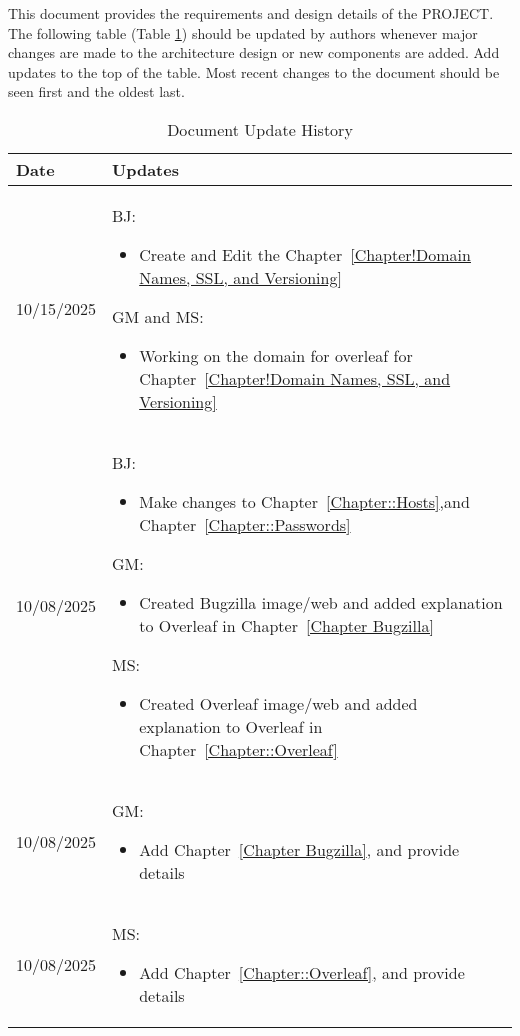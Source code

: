 This document provides the requirements and design details of the
PROJECT.  The following table (Table \ref{Table::UpdateHistory}) should be
updated by authors whenever major changes are made to the architecture
design or new components are added. Add updates to the top of the table.  
Most recent changes to the document should be seen first and the oldest 
last.

\begin{longtable}{|l||p{13.5cm}|}
\caption{Document Update History \label{Table::UpdateHistory}}\\
\hline
\textbf{Date} & \textbf{Updates} \\
\hline 
\endhead




10/15/2025 & BJ:
\begin{itemize}[topsep=0pt,itemsep=0pt,parsep=0pt,partopsep=0pt,leftmargin=12pt]
\item Create and Edit the Chapter~\ref{Chapter!Domain Names, SSL, and Versioning} 
\end{itemize} 
GM and MS:
\begin{itemize}[topsep=0pt,itemsep=0pt,parsep=0pt,partopsep=0pt,leftmargin=12pt]
\item Working on the domain for overleaf for  Chapter~\ref{Chapter!Domain Names, SSL, and Versioning}
\end{itemize} 
\\ \hline



10/08/2025 & BJ:
\begin{itemize}[topsep=0pt,itemsep=0pt,parsep=0pt,partopsep=0pt,leftmargin=12pt]
\item Make changes to Chapter~\ref{Chapter::Hosts},and Chapter~\ref{Chapter::Passwords} 
\end{itemize} 
GM:
\begin{itemize}[topsep=0pt,itemsep=0pt,parsep=0pt,partopsep=0pt,leftmargin=12pt]
\item Created Bugzilla image/web and added explanation to Overleaf in Chapter~\ref{Chapter Bugzilla}
\end{itemize} 
MS:
\begin{itemize}[topsep=0pt,itemsep=0pt,parsep=0pt,partopsep=0pt,leftmargin=12pt]
\item Created Overleaf image/web and added explanation to Overleaf in Chapter~\ref{Chapter::Overleaf}
\end{itemize} 
\\ \hline
10/08/2025 & GM:
\begin{itemize}[topsep=0pt,itemsep=0pt,parsep=0pt,partopsep=0pt,leftmargin=12pt]
\item Add Chapter~\ref{Chapter Bugzilla}, and provide details
\end{itemize} 
\\ \hline
10/08/2025 & MS:
\begin{itemize}[topsep=0pt,itemsep=0pt,parsep=0pt,partopsep=0pt,leftmargin=12pt]
\item Add Chapter~\ref{Chapter::Overleaf}, and provide details
\end{itemize} 
\\ \hline


\end{longtable}
